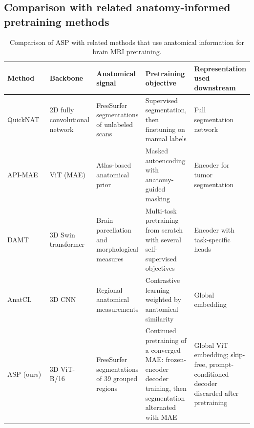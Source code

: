 \documentclass[pdflatex,sn-nature]{sn-jnl}%
\newif\ifhighlight
\newcommand{\rev}[1]{\ifhighlight{\color{blue}{}#1}\else#1\fi}%
\newcommand{\revnote}[1]{\ifhighlight{\color{magenta}\textbf{[#1]}}\fi}
\theoremstyle{thmstyleone}%
\theoremstyle{thmstyletwo}%
\theoremstyle{thmstylethree}%
\begin{document}
\begin{appendices}
\rev{
\section{Comparison with related anatomy-informed pretraining methods}\label{sec:related_work}

\begin{table}[h]
\centering
\caption{Comparison of ASP with related methods that use anatomical information for brain MRI pretraining.}%
\label{tab:related_work}
\footnotesize
\begin{tabular}{p{2.1cm}p{2.0cm}p{2.9cm}p{3.0cm}p{2.6cm}}
\hline
Method & Backbone & Anatomical signal & Pretraining objective & Representation used downstream \\ \hline
QuickNAT~\citep{roy2019quicknat} & 2D fully convolutional network & FreeSurfer segmentations of unlabeled scans & Supervised segmentation, then finetuning on manual labels & Full segmentation network \\
API-MAE~\citep{wang2023improving} & ViT (MAE) & Atlas-based anatomical prior & Masked autoencoding with anatomy-guided masking & Encoder for tumor segmentation \\
DAMT~\citep{kim2024domain} & 3D Swin transformer & Brain parcellation and morphological measures & Multi-task pretraining from scratch with several self-supervised objectives & Encoder with task-specific heads \\
AnatCL~\citep{barbano2025anatomical} & 3D CNN & Regional anatomical measurements & Contrastive learning weighted by anatomical similarity & Global embedding \\
ASP (ours) & 3D ViT-B/16 & FreeSurfer segmentations of 39 grouped regions & Continued pretraining of a converged MAE: frozen-encoder decoder training, then segmentation alternated with MAE & Global ViT embedding; skip-free, prompt-conditioned decoder discarded after pretraining \\ \hline
\end{tabular}
\end{table}
}
\end{appendices}

\end{document}
